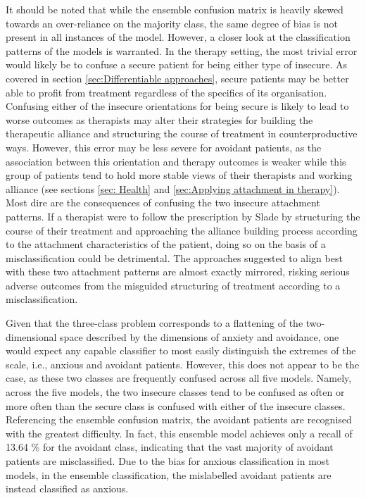 \documentclass[12pt]{report}
\begin{document}
It should be noted that while the ensemble confusion matrix is heavily skewed towards an over-reliance on the majority class, the same degree of bias is not present in all instances of the model.
However, a closer look at the classification patterns of the models is warranted.
In the therapy setting, the most trivial error would likely be to confuse a secure patient for being either type of insecure.
As covered in section \ref{sec:Differentiable approaches}, secure patients may be better able to profit from treatment regardless of the specifics of its organisation.
Confusing either of the insecure orientations for being secure is likely to lead to worse outcomes as therapists may alter their strategies for building the therapeutic alliance and structuring the course of treatment in counterproductive ways.
However, this error may be less severe for avoidant patients, as the association between this orientation and therapy outcomes is weaker while this group of patients tend to hold more stable views of their therapists and working alliance (see sections \ref{sec: Health} and \ref{sec:Applying attachment in therapy}).
Most dire are the consequences of confusing the two insecure attachment patterns.
If a therapist were to follow the prescription by Slade \citeyear{Slade2016} by structuring the course of their treatment and approaching the alliance building process according to the attachment characteristics of the patient, doing so on the basis of a misclassification could be detrimental.
The approaches suggested to align best with these two attachment patterns are almost exactly mirrored, risking serious adverse outcomes from the misguided structuring of treatment according to a misclassification.

Given that the three-class problem corresponds to a flattening of the two-dimensional space described by the dimensions of anxiety and avoidance, one would expect any capable classifier to most easily distinguish the extremes of the scale, i.e., anxious and avoidant patients.
However, this does not appear to be the case, as these two classes are frequently confused across all five models.
Namely, across the five models, the two insecure classes tend to be confused as often or more often than the secure class is confused with either of the insecure classes.
Referencing the ensemble confusion matrix, the avoidant patients are recognised with the greatest difficulty.
In fact, this ensemble model achieves only a recall of 13.64 \% for the avoidant class, indicating that the vast majority of avoidant patients are misclassified.
Due to the bias for anxious classification in most models, in the ensemble classification, the mislabelled avoidant patients are instead classified as anxious.
\end{document}
